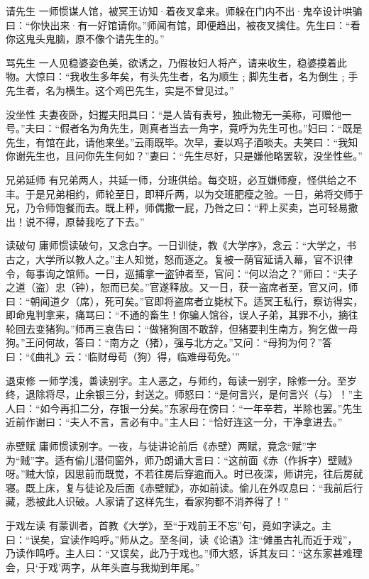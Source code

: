 \documentclass[12pt,UTF8]{ctexbook}
\begin{document}
请先生
一师惯谋人馆，被冥王访知·着夜叉拿来。师躲在门内不出·鬼卒设计哄骗曰：“你快出来·有一好馆请你。”师闻有馆，即便趋出，被夜叉擒住。先生曰：“看你这鬼头鬼脑，原不像个请先生的。”

骂先生
一人见稳婆姿色美，欲诱之，乃假妆妇人将产，请来收生，稳婆摸着此物。大惊曰：“我收生多年矣，有头先生者，名为顺生﹔脚先生者，名为倒生﹔手先生者，名为横生。这个鸡巴先生，实是不曾见过。”

没坐性
夫妻夜卧，妇握夫阳具曰：“是人皆有表号，独此物无一美称，可赠他一号。”夫曰：“假者名为角先生，则真者当去一角字，竟呼为先生可也。”妇曰：“既是先生，有馆在此，请他来坐。”云雨既毕。次早，妻以鸡子酒啖夫。夫笑曰：“我知你谢先生也，且问你先生何如？”妻曰：“先生尽好，只是嫌他略罢软，没坐性些。”

兄弟延师
有兄弟两人，共延一师，分班供给。每交班，必互嫌师瘦，怪供给之不丰。于是兄弟相约，师轮至日，即秤斤两，以为交班肥瘦之验。一日，弟将交师于兄，乃令师饱餐而去。既上秤，师偶撒一屁，乃咎之曰：“秤上买卖，岂可轻易撒出！说不得，原替我吃了下去。”

读破句
庸师惯读破句，又念白字。一日训徒，教《大学序》，念云：“大学之，书古之，大学所以教人之。”主人知觉，怒而逐之。复被一荫官延请入幕，官不识律令，每事询之馆师。一日，巡捕拿一盗钟者至，官问：“何以治之？”师曰：“夫子之道（盗）忠（钟），恕而已矣。”官遂释放。又一日，获一盗席者至，官又问，师曰：“朝闻道夕（席），死可矣。”官即将盗席者立毙杖下。适冥王私行，察访得实，即命鬼判拿来，痛骂曰：“不通的畜生！你骗人馆谷，误人子弟，其罪不小，摘往轮回去变猪狗。”师再三哀告曰：“做猪狗固不敢辞，但猪要判生南方，狗乞做一母狗。”王问何故，答曰：“南方之（猪），强与北方之。”又问：“母狗为何？”答曰：“《曲礼》云：‘临财母苟（狗）得，临难母苟免。’”

退束修
一师学浅，善读别字。主人恶之，与师约，每读一别字，除修一分。至岁终，退除将尽，止余银三分，封送之。师怒曰：“是何言兴，是何言兴（与）！”主人曰：“如今再扣二分，存银一分矣。”东家母在傍曰：“一年辛若，半除也罢。”先生近前作谢曰：“夫人不言，言必有中。”主人曰：“恰好连这一分，干净拿进去。”

赤壁赋
庸师惯读别字。一夜，与徒讲论前后《赤壁）两赋，竟念“赋”字为“贼”字。适有偷儿潜伺窗外，师乃朗诵大言曰：“这前面《赤（作拆字）壁贼》呀。”贼大惊，因思前而既觉，不若往房后穿逾而入。时已夜深，师讲完，往后房就寝。既上床，复与徒论及后面《赤壁赋》，亦如前读。偷儿在外叹息曰：“我前后行藏，悉被此人识破。人家请了这样先生，看家狗都不消养得了！”

于戏左读
有蒙训者，首教《大学》，至“于戏前王不忘”句，竟如字读之。主曰：“误矣，宜读作呜呼。”师从之。至冬间，读《论语》注“傩虽古礼而近于戏”，乃读作鸣呼。主人曰：“又误矣，此乃于戏也。”师大怒，诉其友曰：“这东家甚难理会，只‘于戏’两字，从年头直与我拗到年尾。”
\end{document}
